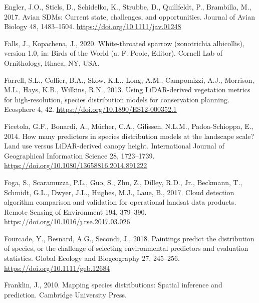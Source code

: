 \documentclass[
  12pt,
]{article}
\newlength{\cslhangindent}
\newlength{\cslentryspacingunit} %
\newenvironment{CSLReferences}[2] %
 {%
  \setlength{\parindent}{0pt}
  \ifodd #1
  \let\oldpar\par
  \def\par{\hangindent=\cslhangindent\oldpar}
  \fi
  \setlength{\parskip}{#2\cslentryspacingunit}
 }%
 {}
\begin{document}
\begin{CSLReferences}{1}{0}
\leavevmode{}%
Engler, J.O., Stiels, D., Schidelko, K., Strubbe, D., Quillfeldt, P., Brambilla, M., 2017. Avian {SDMs}: Current state, challenges, and opportunities. Journal of Avian Biology 48, 1483--1504. \url{https://doi.org/10.1111/jav.01248}

\leavevmode{}%
Falls, J., Kopachena, J., 2020. White-throated sparrow (zonotrichia albicollis), version 1.0, in: Birds of the World (a. F. Poole, Editor). Cornell Lab of Ornithology, Ithaca, {NY}, {USA}.

\leavevmode{}%
Farrell, S.L., Collier, B.A., Skow, K.L., Long, A.M., Campomizzi, A.J., Morrison, M.L., Hays, K.B., Wilkins, R.N., 2013. Using {LiDAR}-derived vegetation metrics for high-resolution, species distribution models for conservation planning. Ecosphere 4, 42. \url{https://doi.org/10.1890/ES12-000352.1}

\leavevmode{}%
Ficetola, G.F., Bonardi, A., Mücher, C.A., Gilissen, N.L.M., Padoa-Schioppa, E., 2014. How many predictors in species distribution models at the landscape scale? Land use versus {LiDAR}-derived canopy height. International Journal of Geographical Information Science 28, 1723--1739. \url{https://doi.org/10.1080/13658816.2014.891222}

\leavevmode{}%
Foga, S., Scaramuzza, P.L., Guo, S., Zhu, Z., Dilley, R.D., Jr., Beckmann, T., Schmidt, G.L., Dwyer, J.L., Hughes, M.J., Laue, B., 2017. Cloud detection algorithm comparison and validation for operational landsat data products. Remote Sensing of Environment 194, 379--390. \url{https://doi.org/10.1016/j.rse.2017.03.026}

\leavevmode{}%
Fourcade, Y., Besnard, A.G., Secondi, J., 2018. Paintings predict the distribution of species, or the challenge of selecting environmental predictors and evaluation statistics. Global Ecology and Biogeography 27, 245--256. \url{https://doi.org/10.1111/geb.12684}

\leavevmode{}%
Franklin, J., 2010. Mapping species distributions: Spatial inference and prediction. Cambridge University Press.


\end{CSLReferences}
\end{document}
